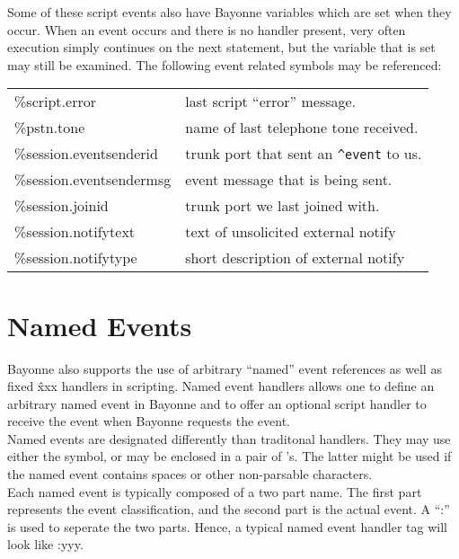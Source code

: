 \documentclass[a4paper,12pt]{article}
\begin{document}
Some of these script events also have Bayonne variables which are set
when they occur.  When an event occurs and there is no handler present,
very often execution simply continues on the next statement, but the
variable that is set may still be examined.  The following event related
symbols may be referenced: \\

\begin{supertabular}{ll}
\%script.error                  & last script ``error'' message. \\
\%pstn.tone                     & name of last telephone tone received. \\
\%session.eventsenderid         & trunk port that sent an \verb=^event= to us. \\
\%session.eventsendermsg        & event message that is being sent. \\
\%session.joinid                & trunk port we last joined with. \\
\%session.notifytext            & text of unsolicited external notify \\
\%session.notifytype            & short description of external notify \\
\end{supertabular}

\section{Named Events}

Bayonne also supports the use of arbitrary ``named'' event references as
well as fixed \^xxx handlers in scripting.  Named event handlers allows
one to define an arbitrary named event in Bayonne and to offer an
optional script handler to receive the event when Bayonne requests the
event. \\

Named events are designated differently than traditonal handlers.  They
may use either the \@ symbol, or may be enclosed in a pair of {}'s.  The
latter might be used if the named event contains spaces or other
non-parsable characters. \\

Each named event is typically composed of a two part name.  The first
part represents the event classification, and the second part is the
actual event.  A ``:'' is used to seperate the two parts.  Hence, a
typical named event handler tag will look like \@xxx:yyy. \\
\end{document}
